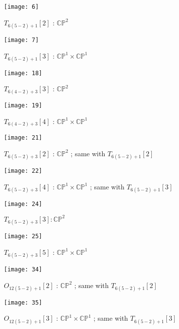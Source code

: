 \documentclass[reqno, twoside, a4paper]{amsart}
\theoremstyle{definition}
\numberwithin{equation}{section}
\begin{document}
\begin{figure}[H]
  \centering
  \texttt{[image: 6]}{}
  \caption{$T_{6(5-2)+1}[2]$ : $\mathbb{CP}^2$}
  \label{figure:CP2-vs-CP1*CP1-first}
\end{figure}

\begin{figure}[H]
  \centering
  \texttt{[image: 7]}
  \caption{$T_{6(5-2)+1}[3]$ : $\mathbb{CP}^1 \times \mathbb{CP}^1$}
\end{figure}

\begin{figure}[H]
  \centering
  \texttt{[image: 18]}
  \caption{$T_{6(4-2)+3}[3]$ : $\mathbb{CP}^2$}
\end{figure}

\begin{figure}[H]
  \centering
  \texttt{[image: 19]}
  \caption{$T_{6(4-2)+3}[4]$ : $\mathbb{CP}^1 \times \mathbb{CP}^1$}
\end{figure}

\begin{figure}[H]
  \centering
  \texttt{[image: 21]}
  \caption{$T_{6(5-2)+3}[2]$ : $\mathbb{CP}^2$ ; same with $T_{6(5-2)+1}[2]$}
\end{figure}

\begin{figure}[H]
  \centering
  \texttt{[image: 22]}
  \caption{$T_{6(5-2)+3}[4]$ : $\mathbb{CP}^1 \times \mathbb{CP}^1$ ; same with $T_{6(5-2)+1}[3]$}
\end{figure}

\begin{figure}[H]
  \centering
  \texttt{[image: 24]}
  \caption{$T_{6(5-2)+3}[3] : \mathbb{CP}^2$}
\end{figure}

\begin{figure}[H]
  \centering
  \texttt{[image: 25]}
  \caption{$T_{6(5-2)+3}[5]$ : $\mathbb{CP}^1 \times \mathbb{CP}^1$}
\end{figure}

\begin{figure}[H]
  \centering
  \texttt{[image: 34]}
  \caption{$O_{12(5-2)+1}[2]$ : $\mathbb{CP}^2$ ; same with $T_{6(5-2)+1}[2]$}
\end{figure}

\begin{figure}[H]
  \centering
  \texttt{[image: 35]}
  \caption{$O_{12(5-2)+1}[3]$ : $\mathbb{CP}^1 \times \mathbb{CP}^1$ ; same with $T_{6(5-2)+1}[3]$}
\end{figure}
\end{document}
